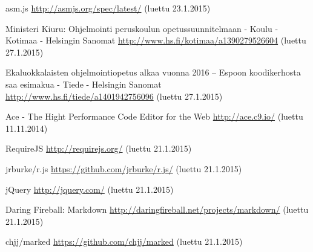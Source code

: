 \begin{thebibliography}{99}
	asm.js \url{http://asmjs.org/spec/latest/} (luettu 23.1.2015)

	Ministeri Kiuru: Ohjelmointi peruskoulun opetussuunnitelmaan - Koulu - Kotimaa - Helsingin Sanomat \url{http://www.hs.fi/kotimaa/a1390279526604} (luettu 27.1.2015)
	
	Ekaluokkalaisten ohjelmointiopetus alkaa vuonna 2016 – Espoon koodikerhosta saa esimakua - Tiede - Helsingin Sanomat \url{http://www.hs.fi/tiede/a1401942756096} (luettu 27.1.2015)

	Ace - The Hight Performance Code Editor for the Web \url{http://ace.c9.io/} (luettu 11.11.2014)

	RequireJS \url{http://requirejs.org/} (luettu 21.1.2015)
	
	jrburke/r.js \url{https://github.com/jrburke/r.js/} (luettu 21.1.2015)
	
	jQuery \url{http://jquery.com/} (luettu 21.1.2015)

	Daring Fireball: Markdown \url{http://daringfireball.net/projects/markdown/} (luettu 21.1.2015)
	
	chjj/marked \url{https://github.com/chjj/marked} (luettu 21.1.2015)

\end{thebibliography}
